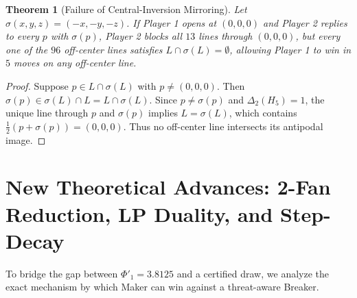 \documentclass[11pt,a4paper]{article}
\newtheorem{theorem}{Theorem}[section]
\theoremstyle{definition}
\theoremstyle{remark}
\begin{document}
\begin{theorem}[Failure of Central-Inversion Mirroring]
\label{thm:nogo4}
Let $\sigma(x,y,z) = (-x,-y,-z)$. If Player 1 opens at $(0,0,0)$ and Player 2 replies to every $p$ with $\sigma(p)$, Player 2 blocks all $13$ lines through $(0,0,0)$, but every one of the $96$ off-center lines satisfies $L \cap \sigma(L) = \emptyset$, allowing Player 1 to win in $5$ moves on any off-center line.
\end{theorem}
\begin{proof}
Suppose $p \in L \cap \sigma(L)$ with $p \neq (0,0,0)$. Then $\sigma(p) \in \sigma(L) \cap L = L \cap \sigma(L)$. Since $p \neq \sigma(p)$ and $\Delta_2(H_5) = 1$, the unique line through $p$ and $\sigma(p)$ implies $L = \sigma(L)$, which contains $\frac{1}{2}(p + \sigma(p)) = (0,0,0)$. Thus no off-center line intersects its antipodal image.
\end{proof}

\section{New Theoretical Advances: 2-Fan Reduction, LP Duality, and Step-Decay}

To bridge the gap between $\Phi'_1 = 3.8125$ and a certified draw, we analyze the exact mechanism by which Maker can win against a threat-aware Breaker.
\end{document}
